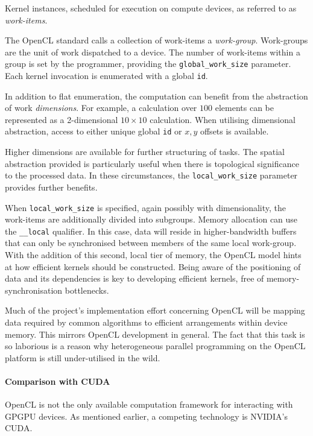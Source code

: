 Kernel instances, scheduled for execution on compute devices, as referred to as \emph{work-items}.

The \ac{OpenCL} standard calls a collection of work-items a \emph{work-group}. Work-groups are the unit of work dispatched to a device. The number of work-items within a group is set by the programmer, providing the \verb|global_work_size| parameter. Each kernel invocation is enumerated with a global \verb|id|. 

In addition to flat enumeration, the computation can benefit from the abstraction of work \emph{dimensions}. For example, a calculation over $100$ elements can be represented as a 2-dimensional $10 \times 10$ calculation. When utilising dimensional abstraction, access to either unique global \verb|id| or $x, y$ offsets is available.

Higher dimensions are available for further structuring of tasks. The spatial abstraction provided is particularly useful when there is topological significance to the processed data. In these circumstances, the \verb|local_work_size| parameter provides further benefits.

When \verb|local_work_size| is specified, again possibly with dimensionality, the work-items are additionally divided into subgroups. Memory allocation can use the \verb|__local| qualifier. In this case, data will reside in higher-bandwidth buffers that can only be synchronised between members of the same local work-group. With the addition of this second, local tier of memory, the \ac{OpenCL} model hints at how efficient kernels should be constructed. Being aware of the positioning of data and its dependencies is key to developing efficient kernels, free of memory-synchronisation bottlenecks.

Much of the project's implementation effort concerning \ac{OpenCL} will be mapping data required by common algorithms to efficient arrangements within device memory. This mirrors \ac{OpenCL} development in general.
The fact that this task is so laborious is a reason why heterogeneous parallel programming on the \ac{OpenCL} platform is still under-utilised in the wild.

\paragraph*{Comparison with CUDA}
\ac{OpenCL} is not the only available computation framework for interacting with \ac{GPGPU} devices. As mentioned earlier, a competing technology is NVIDIA's \ac{CUDA}.

